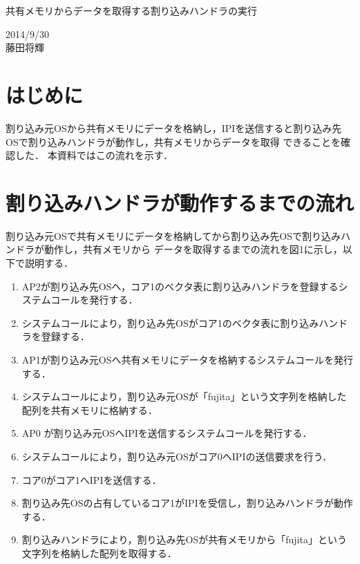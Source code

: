 \documentclass[12pt]{jsarticle}
\begin{document}

\begin{center}
{\LARGE 共有メモリからデータを取得する割り込みハンドラの実行}
\end{center}

\begin{flushright}
  2014/9/30\\
  藤田将輝
\end{flushright}
\section{はじめに}

割り込み元OSから共有メモリにデータを格納し，IPIを送信すると割り込み先OSで割り込みハンドラが動作し，共有メモリからデータを取得
できることを確認した．
本資料ではこの流れを示す．

\section{割り込みハンドラが動作するまでの流れ}
割り込み元OSで共有メモリにデータを格納してから割り込み先OSで割り込みハンドラが動作し，共有メモリから
データを取得するまでの流れを図1に示し，以下で説明する．
\begin{enumerate}
\item AP2が割り込み先OSへ，コア1のベクタ表に割り込みハンドラを登録するシステムコールを発行する．
\item システムコールにより，割り込み先OSがコア1のベクタ表に割り込みハンドラを登録する．
\item AP1が割り込み元OSへ共有メモリにデータを格納するシステムコールを発行する．
\item システムコールにより，割り込み元OSが「fujita」という文字列を格納した配列を共有メモリに格納する．
\item AP0 が割り込み元OSへIPIを送信するシステムコールを発行する．
\item システムコールにより，割り込み元OSがコア0へIPIの送信要求を行う．
\item コア0がコア1へIPIを送信する．
\item 割り込み先OSの占有しているコア1がIPIを受信し，割り込みハンドラが動作する．
\item 割り込みハンドラにより，割り込み先OSが共有メモリから「fujita」という文字列を格納した配列を取得する．
\end{enumerate}
\end{document}
